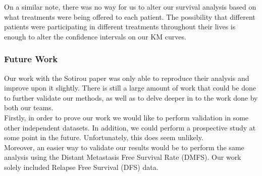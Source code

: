 \documentclass[a4paper,10pt]{article}
\begin{document}
On a similar note, there was no way for us to alter our survival analysis 
based on what treatments were being offered to each patient. The 
possibility that different patients were participating in different treatments 
throughout their lives is enough to alter the confidence intervals on our KM 
curves.

\subsubsection{Future Work}
Our work with the Sotirou paper was only able to reproduce their analysis 
and improve upon it slightly. There is still a large amount of work that could 
be done to further validate our methods, as well as to delve deeper in to the 
work done by both our teams.\\

Firstly, in order to prove our work we would like to perform validation in
 some other independent datasets. In addition, we could perform a 
prospective study at some point in the future. Unfortunately, this does seem 
unlikely.\\

Moreover, an easier way to validate our results would be to perform the same 
analysis using the Distant Metastasis Free Survival Rate (DMFS). Our work 
solely included Relapse Free Survival (DFS) data.


 \markright{ }
\end{document}
